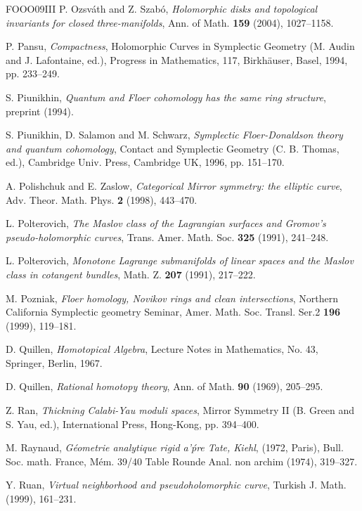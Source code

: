 \begin{thebibliography}{FOOO09III}
 P. Ozsváth and Z. Szabó, \emph{Holomorphic disks and topological invariants for closed three-manifolds}, Ann. of Math. \textbf{159} (2004), 1027–1158.

 P. Pansu, \emph{Compactness}, Holomorphic Curves in Symplectic Geometry (M. Audin and J. Lafontaine, ed.), Progress in Mathematics, 117, Birkhäuser, Basel, 1994, pp. 233–249.

 S. Piunikhin, \emph{Quantum and Floer cohomology has the same ring structure}, preprint (1994).

 S. Piunikhin, D. Salamon and M. Schwarz, \emph{Symplectic Floer-Donaldson theory and quantum cohomology}, Contact and Symplectic Geometry (C. B. Thomas, ed.), Cambridge Univ. Press, Cambridge UK, 1996, pp. 151–170.

 A. Polishchuk and E. Zaslow, \emph{Categorical Mirror symmetry: the elliptic curve}, Adv. Theor. Math. Phys. \textbf{2} (1998), 443–470.

 L. Polterovich, \emph{The Maslov class of the Lagrangian surfaces and Gromov's pseudo-holomorphic curves}, Trans. Amer. Math. Soc. \textbf{325} (1991), 241–248.

 L. Polterovich, \emph{Monotone Lagrange submanifolds of linear spaces and the Maslov class in cotangent bundles}, Math. Z. \textbf{207} (1991), 217–222.

 M. Pozniak, \emph{Floer homology, Novikov rings and clean intersections}, Northern California Symplectic geometry Seminar, Amer. Math. Soc. Transl. Ser.2 \textbf{196} (1999), 119–181.

 D. Quillen, \emph{Homotopical Algebra}, Lecture Notes in Mathematics, No. 43, Springer, Berlin, 1967.

 D. Quillen, \emph{Rational homotopy theory}, Ann. of Math. \textbf{90} (1969), 205–295.

 Z. Ran, \emph{Thickning Calabi-Yau moduli spaces}, Mirror Symmetry II (B. Green and S. Yau, ed.), International Press, Hong-Kong, pp. 394–400.

 M. Raynaud, \emph{Géometrie analytique rigid a'ṕre Tate, Kiehl}, (1972, Paris), Bull. Soc. math. France, Mém. 39/40 Table Rounde Anal. non archim (1974), 319–327.

 Y. Ruan, \emph{Virtual neighborhood and pseudoholomorphic curve}, Turkish J. Math. (1999), 161–231.


\end{thebibliography}
